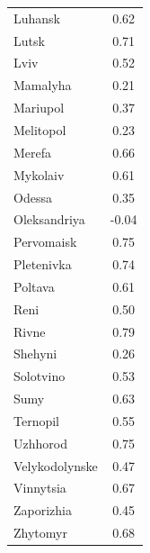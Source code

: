\documentclass[sn-basic]{sn-jnl}%
\begin{document}
{\begin{appendices}
\begin{table}[hbtp]
\begin{tabular}{lc}
Luhansk                           & 0.62          \\
Lutsk                             & 0.71          \\
Lviv                              & 0.52          \\
Mamalyha                          & 0.21          \\
Mariupol                          & 0.37          \\
Melitopol                         & 0.23          \\
Merefa                            & 0.66          \\
Mykolaiv                          & 0.61          \\
Odessa                            & 0.35          \\
Oleksandriya                      & -0.04         \\
Pervomaisk                        & 0.75          \\
Pletenivka                        & 0.74          \\
Poltava                           & 0.61          \\
Reni                              & 0.50          \\
Rivne                             & 0.79          \\
Shehyni                           & 0.26          \\
Solotvino                         & 0.53          \\
Sumy                              & 0.63          \\
Ternopil                          & 0.55          \\
Uzhhorod                          & 0.75          \\
Velykodolynske                    & 0.47          \\
Vinnytsia                         & 0.67          \\
Zaporizhia                        & 0.45          \\
Zhytomyr                          & 0.68          \\ \bottomrule
\end{tabular}
\end{table}





\end{appendices}}
\end{document}
